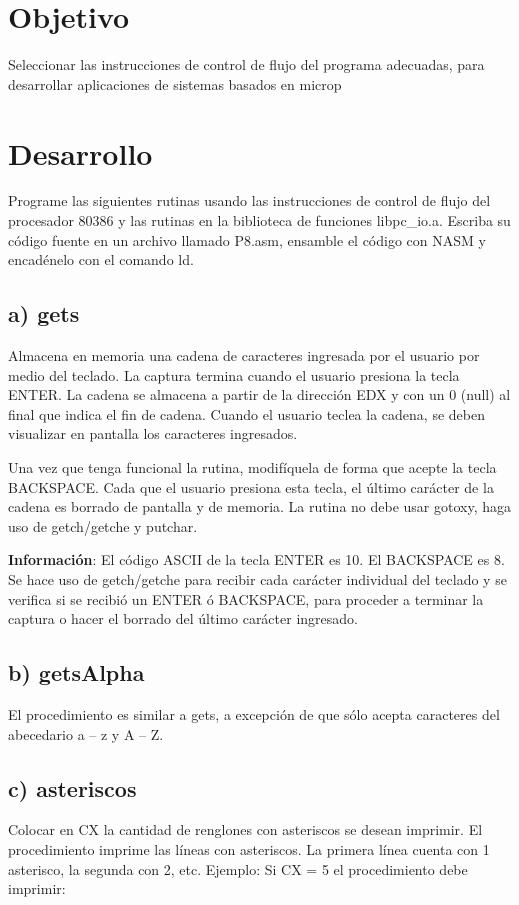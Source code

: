 \documentclass[12pt]{article}
\begin{document}
\section*{Objetivo}
\label{sec:org31b68e0}
Seleccionar las instrucciones de control de flujo del programa adecuadas, para
desarrollar aplicaciones de sistemas basados en microp

\section*{Desarrollo}
\label{sec:orgca0430b}
Programe las siguientes rutinas usando las instrucciones de control de flujo del
procesador 80386 y las rutinas en la biblioteca de funciones libpc\_io.a. Escriba su
código fuente en un archivo llamado P8.asm, ensamble el código con NASM y
encadénelo con el comando ld.

\subsection*{a) gets}
\label{sec:org19494f9}
Almacena en memoria una cadena de caracteres ingresada por el usuario por medio
del teclado. La captura termina cuando el usuario presiona la tecla ENTER. La 
cadena se almacena a partir de la dirección EDX y con un 0 (null) al final que 
indica el fin de cadena. Cuando el usuario teclea la cadena, se deben 
visualizar en pantalla los caracteres ingresados.

Una vez que tenga funcional la rutina, modifíquela de forma que acepte la tecla
BACKSPACE. Cada que el usuario presiona esta tecla, el último carácter de la 
cadena es borrado de pantalla y de memoria. La rutina no debe usar gotoxy, 
haga uso de getch/getche y putchar.

\textbf{Información}: El código ASCII de la tecla ENTER es 10. El BACKSPACE es 8. Se 
hace uso de getch/getche para recibir cada carácter individual del teclado y 
se verifica si se recibió un ENTER ó BACKSPACE, para proceder a terminar la 
captura o hacer el borrado del último carácter ingresado.

\subsection*{b) getsAlpha}
\label{sec:orge34ba3d}
El procedimiento es similar a gets, a excepción de que sólo acepta caracteres
del abecedario a – z y A – Z.

\subsection*{c) asteriscos}
\label{sec:org595665a}
Colocar en CX la cantidad de renglones con asteriscos se desean imprimir. El
procedimiento imprime las líneas con asteriscos. La primera línea cuenta con 
1 asterisco, la segunda con 2, etc. Ejemplo: Si CX = 5 el procedimiento debe 
imprimir:
\end{document}
